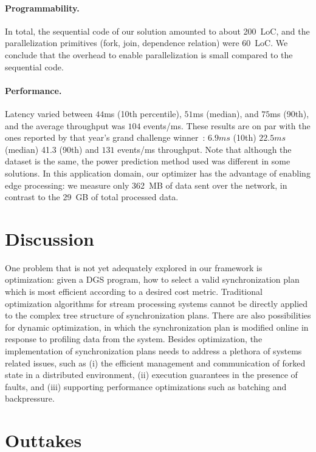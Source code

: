 \paragraph{Programmability.}
In total, the sequential code of our solution amounted to about 200~LoC, and the parallelization primitives (fork, join,
dependence relation) were 60~LoC.  We conclude that the overhead to enable
parallelization is small compared to the sequential code.

\paragraph{Performance.}
Latency varied between $44$ms (10th percentile), $51$ms (median), and
$75$ms (90th), and the average throughput was $104$
events/ms. These results are on par with the ones reported
by that year's grand challenge winner~\cite{mutschler2014predictive}:
$6.9ms$ (10th) $22.5ms$ (median) 41.3 (90th) and $131$ events/ms
throughput.
Note that although the dataset is the same,
the power prediction method used was different in some solutions.  In
this application domain, our optimizer has the advantage of enabling
edge processing: we measure only 362~MB of data sent over the network,
in contrast to the 29~GB of total processed data.

\section{Discussion}
\label{dgs:sec:conclusion}

One problem that is not yet adequately explored in our framework is optimization:
given a DGS program, how to select a valid synchronization plan which is most efficient according to a desired cost metric.
Traditional optimization algorithms for stream processing systems cannot be directly applied to
the complex tree structure of synchronization plans.
There are also possibilities for
dynamic optimization, in which the synchronization plan is modified online in response to profiling data from the system.
Besides optimization, the implementation of synchronization plans needs to address a plethora of systems related issues, such as (i) the efficient management and communication of forked state in a distributed environment, (ii) execution guarantees in the presence of faults, and (iii) supporting performance optimizations such as batching and backpressure.

\section{Outtakes}

